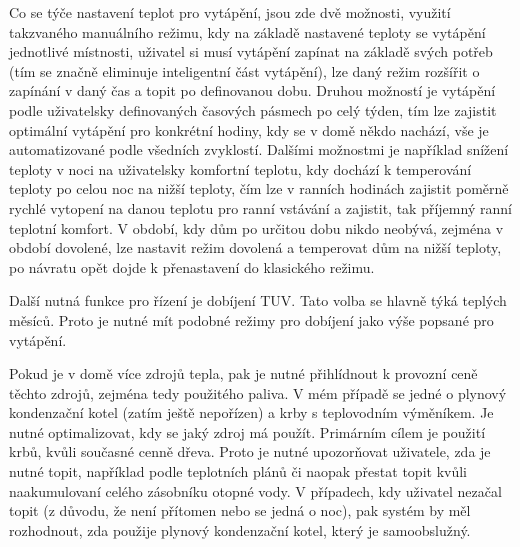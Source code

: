 Co se týče nastavení teplot pro vytápění, jsou zde dvě možnosti, využití takzvaného manuálního režimu, kdy na základě nastavené teploty se vytápění jednotlivé místnosti, uživatel si musí vytápění zapínat na základě svých potřeb (tím se značně eliminuje inteligentní část vytápění), lze daný režim rozšířit o zapínání  v daný čas a topit po definovanou dobu. Druhou možností je vytápění podle uživatelsky definovaných časových pásmech po celý týden, tím lze zajistit optimální vytápění pro konkrétní hodiny, kdy se v domě někdo nachází, vše je automatizované podle všedních zvyklostí. Dalšími možnostmi je například snížení teploty v noci na uživatelsky komfortní teplotu, kdy dochází k temperování teploty po celou noc na nižší teploty, čím lze v ranních hodinách  zajistit poměrně rychlé vytopení na danou teplotu pro ranní vstávání a zajistit, tak příjemný ranní teplotní komfort. V období, kdy dům po určitou dobu nikdo neobývá, zejména v období dovolené, lze nastavit režim dovolená a temperovat dům na nižší teploty, po návratu opět dojde k přenastavení do klasického režimu. 

Další nutná funkce pro řízení je dobíjení TUV. Tato volba se hlavně týká teplých měsíců. Proto je nutné mít podobné režimy pro dobíjení jako výše popsané pro vytápění.

Pokud je v domě více zdrojů tepla, pak je nutné přihlídnout k provozní ceně těchto zdrojů, zejména tedy použitého paliva. V mém případě se jedné o plynový kondenzační kotel (zatím ještě nepořízen) a krby s teplovodním výměníkem. Je nutné optimalizovat, kdy se jaký zdroj má použít. Primárním cílem je použití krbů, kvůli současné cenně dřeva. Proto je nutné upozorňovat uživatele, zda je nutné topit, například podle teplotních plánů či naopak přestat topit kvůli naakumulovaní celého zásobníku otopné vody. V případech, kdy uživatel nezačal topit (z důvodu, že není přítomen nebo se jedná o noc), pak systém by měl rozhodnout, zda použije plynový kondenzační kotel, který je samoobslužný.

